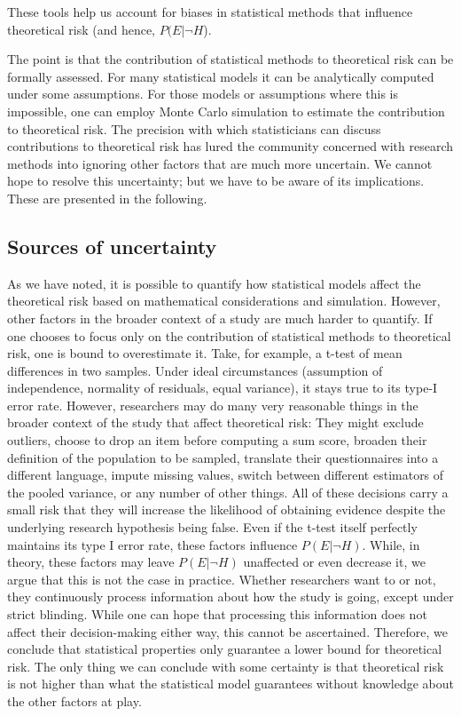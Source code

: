 \documentclass[jou,a4paper]{apa7}
\begin{document}
These tools help us account for biases in statistical methods that influence theoretical risk (and hence, $P(E|\neg{}H$).\par
The point is that the contribution of statistical methods to theoretical risk can be formally assessed.
For many statistical models it can be analytically computed under some assumptions.
For those models or assumptions where this is impossible, one can employ Monte Carlo simulation to estimate the contribution to theoretical risk.
The precision with which statisticians can discuss contributions to theoretical risk has lured the community concerned with research methods into ignoring other factors that are much more uncertain.
We cannot hope to resolve this uncertainty; but we have to be aware of its implications.
These are presented in the following.

\subsection{Sources of uncertainty} 
As we have noted, it is possible to quantify how statistical models affect the theoretical risk based on mathematical considerations and simulation.
However, other factors in the broader context of a study are much harder to quantify.
If one chooses to focus only on the contribution of statistical methods to theoretical risk, one is bound to overestimate it.
Take, for example, a t-test of mean differences in two samples.
Under ideal circumstances (assumption of independence, normality of residuals, equal variance), it stays true to its type-I error rate.
However, researchers may do many very reasonable things in the broader context of the study that affect theoretical risk:
They might exclude outliers, choose to drop an item before computing a sum score, broaden their definition of the population to be sampled, translate their questionnaires into a different language, impute missing values, switch between different estimators of the pooled variance, or any number of other things.
All of these decisions carry a small risk that they will increase the likelihood of obtaining evidence despite the underlying research hypothesis being false.
Even if the t-test itself perfectly maintains its type I error rate, these factors influence $P(E|\neg{}H)$.
While, in theory, these factors may leave $P(E|\neg{}H)$ unaffected or even decrease it, we argue that this is not the case in practice.
Whether researchers want to or not, they continuously process information about how the study is going, except under strict blinding.
While one can hope that processing this information does not affect their decision-making either way, this cannot be ascertained.
Therefore, we conclude that statistical properties only guarantee a lower bound for theoretical risk.
The only thing we can conclude with some certainty is that theoretical risk is not higher than what the statistical model guarantees without knowledge about the other factors at play.
\end{document}
